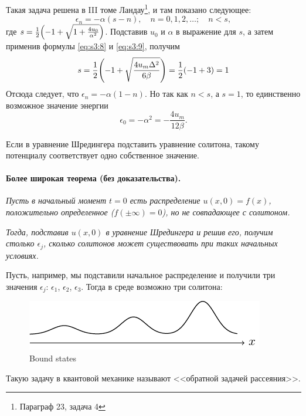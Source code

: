 Такая задача решена в III томе Ландау\footnote{Параграф 23, задача 4}, и там показано следующее:
\begin{equation*}
	\epsilon_n=-\alpha(s-n), \quad
		n=0,1,2,\ldots; \quad n<s,
\end{equation*}
где $s=\frac12\qty(-1+\sqrt{1+\frac{4u_0}{\alpha^2}})$. Подставив $u_0$ и $\alpha$ в выражение для $s$, а затем применив формулы \eqref{eq:s3:8} и \eqref{eq:s3:9}, получим
\begin{equation*}
	s=\frac12\qty(-1+\sqrt{\frac{4u_m\Delta^2}{6\beta}})=\frac12(-1+3)=1
\end{equation*}
Отсюда следует, что $\epsilon_n=-\alpha(1-n)$. Но так как $n<s$, а $s=1$, то единственно возможное значение энергии
\begin{equation*}
 	\epsilon_0=-\alpha^2=-\frac{4u_m}{12\beta}.
\end{equation*} 

Если в уравнение Шредингера подставить уравнение солитона, такому потенциалу соответствует одно собственное значение. 

\paragraph{Более широкая теорема (без доказательства).} \textit{Пусть в начальный момент $t=0$ есть распределение $u(x,0)=f(x)$, положительно определенное ($f(\pm\infty)=0$), но не совпадающее с солитоном.}

\textit{Тогда, подставив $u(x,0)$ в уравнение Шредингера и решив его, получим столько $\epsilon_j$, сколько солитонов может существовать при таких начальных условиях.}

Пусть, например, мы подставили начальное распределение и получили три значения $\epsilon_j$: $\epsilon_1$, $\epsilon_2$, $\epsilon_3$. Тогда в среде возможно три солитона:

\begin{figure}[H]
	\centering
	\includegraphics[scale=1.5]{img/soliton/solitons}
	\caption{Bound states}
\end{figure}
Такую задачу в квантовой механике называют <<обратной задачей рассеяния>>.

